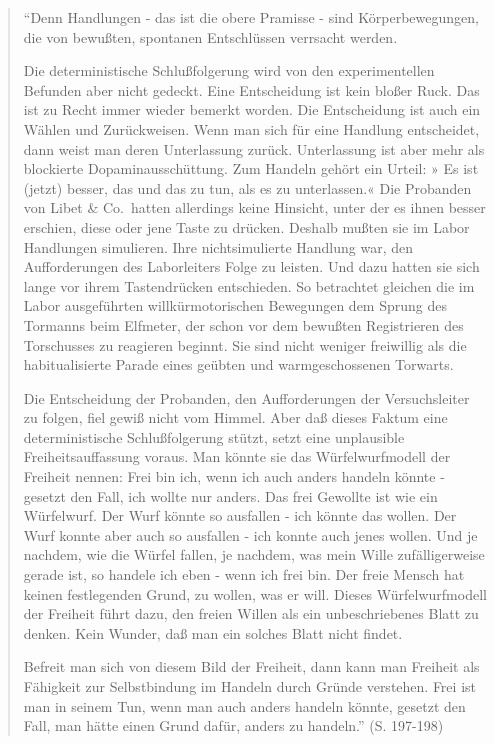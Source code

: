 \documentclass[
  a4paper,
]{report}
\begin{document}
\begin{quote}
``Denn Handlungen - das ist die obere Pramisse - sind Körperbewegungen, die von bewußten, spontanen Entschlüssen verrsacht werden.

Die deterministische Schlußfolgerung wird von den experimentellen Befunden aber nicht gedeckt. Eine Entscheidung ist kein bloßer Ruck. Das ist zu Recht immer wieder bemerkt worden. Die Entscheidung ist auch ein Wählen und Zurückweisen. Wenn man sich für eine Handlung entscheidet, dann weist man deren Unterlassung zurück. Unterlassung ist aber mehr als blockierte Dopaminausschüttung. Zum Handeln gehört ein Urteil: » Es ist (jetzt) besser, das und das zu tun, als es zu unterlassen.« Die Probanden von Libet \& Co.~hatten allerdings keine Hinsicht, unter der es ihnen besser erschien, diese oder jene Taste zu drücken. Deshalb mußten sie im Labor Handlungen simulieren. Ihre nichtsimulierte Handlung war, den Aufforderungen des Laborleiters Folge zu leisten. Und dazu hatten sie sich lange vor ihrem Tastendrücken entschieden. So betrachtet gleichen die im Labor ausgeführten willkürmotorischen Bewegungen dem Sprung des Tormanns beim Elfmeter, der schon vor dem bewußten Registrieren des Torschusses zu reagieren beginnt. Sie sind nicht weniger freiwillig als die habitualisierte Parade eines geübten und warmgeschossenen Torwarts.

Die Entscheidung der Probanden, den Aufforderungen der Versuchsleiter zu folgen, fiel gewiß nicht vom Himmel. Aber daß dieses Faktum eine deterministische Schlußfolgerung stützt, setzt eine unplausible Freiheitsauffassung voraus. Man könnte sie das Würfelwurfmodell der Freiheit nennen: Frei bin ich, wenn ich auch anders handeln könnte - gesetzt den Fall, ich wollte nur anders. Das frei Gewollte ist wie ein Würfelwurf. Der Wurf könnte so ausfallen - ich könnte das wollen. Der Wurf konnte aber auch so ausfallen - ich konnte auch jenes wollen. Und je nachdem, wie die Würfel fallen, je nachdem, was mein Wille zufälligerweise gerade ist, so handele ich eben - wenn ich frei bin. Der freie Mensch hat keinen festlegenden Grund, zu wollen, was er will. Dieses Würfelwurfmodell der Freiheit führt dazu, den freien Willen als ein unbeschriebenes Blatt zu denken. Kein Wunder, daß man ein solches Blatt nicht findet.

Befreit man sich von diesem Bild der Freiheit, dann kann man Freiheit als Fähigkeit zur Selbstbindung im Handeln durch Gründe verstehen. Frei ist man in seinem Tun, wenn man auch anders handeln könnte, gesetzt den Fall, man hätte einen Grund dafür, anders zu handeln.'' (S. 197-198)
\end{quote}
\end{document}
